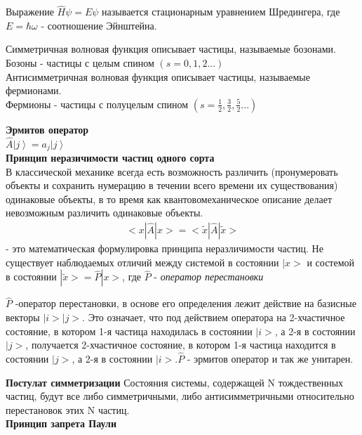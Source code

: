 \documentclass[__minimum__.tex]{subfiles}
\begin{document}
	\begin{definition}
	Выражение $\hat{H}\psi = E\psi$ называется стационарным уравнением Шредингера, где $E = \hbar \omega$ - соотношение Эйнштейна.\\
	\end{definition}
	\begin{definition}
	Симметричная волновая функция описывает частицы, называемые бозонами.\\
	Бозоны - частицы с целым спином $(s = 0,1,2...)$\\
	Антисимметричная волновая функция описывает частицы, называемые фермионами.\\
	Фермионы - частицы с полуцелым спином $(s = \frac{1}{2},\frac{3}{2},\frac{5}{2}...)$\\
	\end{definition}
	\textbf{Эрмитов оператор}\\
	$\hat{A}\left|j\right> = a_j\left|j\right>$\\
	\textbf{Принцип неразичимости частиц одного сорта}\\
	В классической механике всегда есть возможность различить (пронумеровать объекты и сохранить нумерацию в течении всего времени их существования) одинаковые объекты, в то время как квантовомеханическое описание делает невозможным различить одинаковые объекты.
	\begin{gather}
	<x|\hat{A}|x> = <\widetilde{x}|\hat{A}|\widetilde{x}>
	\end{gather}
	- это математическая формулировка принципа неразличимости частиц. Не существует наблюдаемых отличий между системой в состоянии $|x>$ и состемой в состоянии $|\widetilde{x}> = \hat{P}|x>$, где $\hat{P}$ - \textit{оператор перестановки}
	\begin{definition}
	$\hat{P}$ -оператор перестановки, в основе его определения лежит действие на базисные векторы $|i> |j>$. Это означает, что под действием оператора на 2-хчастичное состояние, в котором 1-я частица находилась в состоянии $|i>$, а 2-я в состоянии $|j>$, получается 2-хчастичное состояние, в котором 1-я частица находится в состоянии $|j>$, а 2-я в состоянии $|i>$.$\hat{P}$ - эрмитов оператор и так же унитарен.\\
	\end{definition}
	\textbf{Постулат симметризации}
	Состояния системы, содержащей N тождественных частиц, будут все либо симметричными, либо антисимметричными относительно перестановок этих N частиц.\\
	\textbf{Принцип запрета Паули}\\
\end{document}
